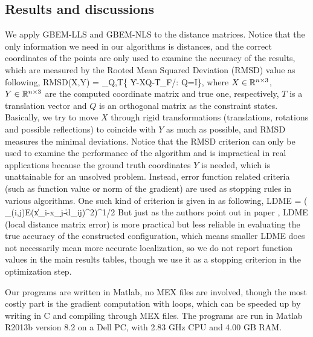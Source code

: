 \documentclass[a4paper,12pt]{article}
\begin{document}
\subsection{Results and discussions}
We apply GBEM-LLS and GBEM-NLS to the distance matrices. Notice that the only information we need in our algorithms is distances, and the correct coordinates of the points are only used to examine the accuracy of the results, which are measured by the Rooted Mean Squared Deviation (RMSD) value as following,
\be RMSD(X,Y) = \min_{Q,T}\{ \|Y-XQ-T\|_{F}/: Q=I\}, \ee
where $X\in \mathbb{R}^{n\times 3}$, $Y\in \mathbb{R}^{n\times 3}$ are the computed coordinate matrix and true one, respectively, $T$ is a translation vector and $Q$ is an orthogonal matrix as the constraint states. Basically, we try to move $X$ through rigid transformations (translations, rotations and possible reflections) to coincide with $Y$ as much as possible, and RMSD measures the minimal deviations. Notice that the RMSD criterion can only be used to examine the performance of the algorithm and is impractical in real applications because the ground truth coordinates $Y$ is needed, which is unattainable for an unsolved problem. Instead, error function related criteria (such as function value or norm of the gradient) are used as stopping rules in various algorithms. One such kind of criterion is given in \cite{Biswas2008} as following,
\be LDME = \Big( \sum_{(i,j)\in E}\big(\|x_i-x_j\|-d_{ij}\big)^2\Big)^{1/2}\ee
But just as the authors point out in paper \cite{Biswas2008}, LDME (local
distance matrix error) is more practical but less reliable in evaluating the true accuracy of the constructed configuration, which means smaller LDME does not necessarily mean more accurate localization, so we do not report function values in the main results tables, though we use it as a stopping criterion in the optimization step.

Our programs are written in Matlab, no MEX files are involved, though the most costly part is the gradient computation with loops, which can be speeded up by writing in C and compiling through MEX files. The programs are run in Matlab R2013b version 8.2 on a Dell PC, with 2.83 GHz CPU and 4.00 GB RAM.
\end{document}
